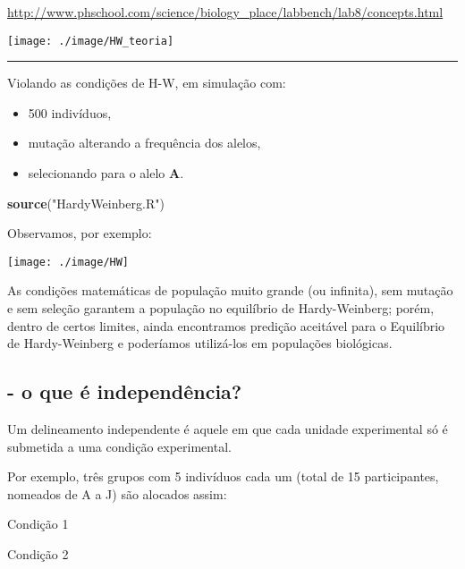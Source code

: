 \documentclass[]{article}
\newenvironment{Shaded}{\begin{snugshade}}{\end{snugshade}}
\newcommand{\KeywordTok}[1]{\textcolor[rgb]{0.13,0.29,0.53}{\textbf{#1}}}
\newcommand{\StringTok}[1]{\textcolor[rgb]{0.31,0.60,0.02}{#1}}
\newcommand{\NormalTok}[1]{#1}
\providecommand{\tightlist}{%
  \setlength{\itemsep}{0pt}\setlength{\parskip}{0pt}}
\begin{document}
\url{http://www.phschool.com/science/biology_place/labbench/lab8/concepts.html}

\begin{center}\texttt{[image: ./image/HW\_teoria]} \end{center}

\begin{center}\rule{0.5\linewidth}{\linethickness}\end{center}

Violando as condições de H-W, em simulação com:

\begin{itemize}
\tightlist
\item
  500 indivíduos,
\item
  mutação alterando a frequência dos alelos,
\item
  selecionando para o alelo \textbf{A}.
\end{itemize}

\begin{Shaded}
\begin{Highlighting}[]
\KeywordTok{source}\NormalTok{(}\StringTok{"HardyWeinberg.R"}\NormalTok{)}
\end{Highlighting}
\end{Shaded}

Observamos, por exemplo:

\begin{center}\texttt{[image: ./image/HW]} \end{center}

As condições matemáticas de população muito grande (ou infinita), sem
mutação e sem seleção garantem a população no equilíbrio de
Hardy-Weinberg; porém, dentro de certos limites, ainda encontramos
predição aceitável para o Equilíbrio de Hardy-Weinberg e poderíamos
utilizá-los em populações biológicas.

\subsection{- o que é independência?}\label{o-que-e-independencia}

Um delineamento independente é aquele em que cada unidade experimental
só é submetida a uma condição experimental.

Por exemplo, três grupos com 5 indivíduos cada um (total de 15
participantes, nomeados de A a J) são alocados assim:

 Condição 1

 Condição 2
\end{document}

